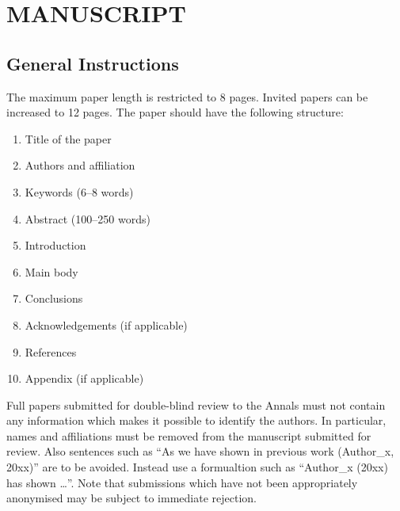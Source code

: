 \documentclass{isprs} %
\begin{document}

\maketitle


\section{MANUSCRIPT}\label{MANUSCRIPT}
 
\sloppy

\subsection{General Instructions}\label{sec:General Instructions}

The maximum paper length is restricted to 8 pages. Invited papers can be increased to 12 pages. The paper should have the following structure: 

\begin{enumerate}
\setlength\itemsep{0em}\setlength\parskip{0em}\setlength\topsep{0em}\setlength\partopsep{0em}\setlength\parsep{0em} 
\item{Title of the paper} 
\item{Authors and affiliation}
\item{Keywords (6--8 words)}
\item{Abstract (100--250 words)}
\item{Introduction}
\item{Main body}
\item{Conclusions}
\item{Acknowledgements (if applicable)}
\item{References}
\item{Appendix (if applicable)}
\end{enumerate}

Full papers submitted for double-blind review to the Annals must not contain any information 
which makes it possible to identify the authors. In particular, names and affiliations must be 
removed from the manuscript submitted for review. Also sentences such as ``As we have shown in 
previous work (Author\_x, 20xx)'' are to be avoided. Instead use a formualtion such 
as ``Author\_x (20xx) has shown \ldots''. Note that submissions which have not been 
appropriately anonymised may be subject to immediate rejection.
\newpage            
\end{document}
